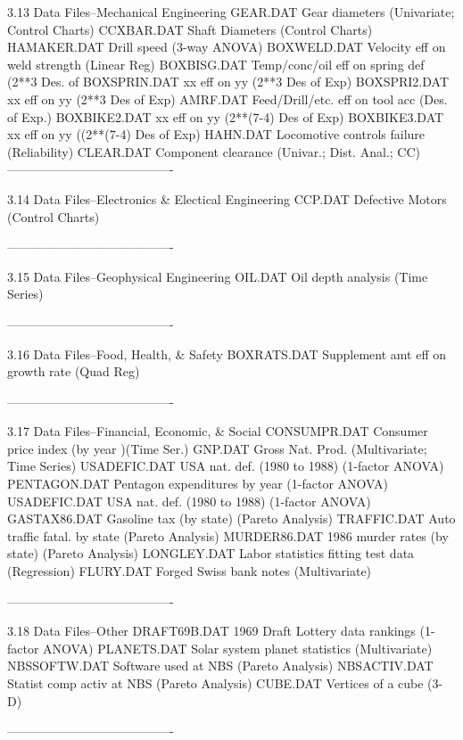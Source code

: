 3.13
Data Files--Mechanical Engineering
      GEAR.DAT      Gear diameters (Univariate; Control Charts)
      CCXBAR.DAT    Shaft Diameters (Control Charts)
      HAMAKER.DAT   Drill speed (3-way ANOVA)
      BOXWELD.DAT   Velocity eff on weld strength (Linear Reg)
      BOXBISG.DAT   Temp/conc/oil eff on spring def (2**3 Des. of
      BOXSPRIN.DAT  xx eff on yy (2**3 Des of Exp)
      BOXSPRI2.DAT  xx eff on yy (2**3 Des of Exp)
      AMRF.DAT      Feed/Drill/etc. eff on tool acc (Des. of Exp.)
      BOXBIKE2.DAT  xx eff on yy (2**(7-4) Des of Exp)
      BOXBIKE3.DAT  xx eff on yy ((2**(7-4) Des of Exp)
      HAHN.DAT      Locomotive controls failure (Reliability)
      CLEAR.DAT     Component clearance (Univar.; Dist. Anal.; CC)
----------------------------------------
 
3.14
Data Files--Electronics & Electical Engineering
      CCP.DAT       Defective Motors (Control Charts)
 
----------------------------------------
 
3.15
Data Files--Geophysical Engineering
      OIL.DAT       Oil depth analysis (Time Series)
 
 
----------------------------------------
 
3.16
Data Files--Food, Health, & Safety
      BOXRATS.DAT   Supplement amt eff on growth rate (Quad Reg)
 
----------------------------------------
 
3.17
Data Files--Financial, Economic, & Social
      CONSUMPR.DAT  Consumer price index (by year )(Time Ser.)
      GNP.DAT       Gross Nat. Prod. (Multivariate; Time Series)
      USADEFIC.DAT  USA nat. def. (1980 to 1988) (1-factor ANOVA)
      PENTAGON.DAT  Pentagon expenditures by year (1-factor ANOVA)
      USADEFIC.DAT  USA nat. def. (1980 to 1988) (1-factor ANOVA)
      GASTAX86.DAT  Gasoline tax (by state) (Pareto Analysis)
      TRAFFIC.DAT   Auto traffic fatal. by state (Pareto Analysis)
      MURDER86.DAT  1986 murder rates (by state) (Pareto Analysis)
      LONGLEY.DAT   Labor statistics fitting test data (Regression)
      FLURY.DAT     Forged Swiss bank notes (Multivariate)
 
----------------------------------------
 
3.18
Data Files--Other
      DRAFT69B.DAT  1969 Draft Lottery data rankings (1-factor ANOVA)
      PLANETS.DAT   Solar system planet statistics (Multivariate)
      NBSSOFTW.DAT  Software used at NBS (Pareto Analysis)
      NBSACTIV.DAT  Statist comp activ at NBS (Pareto Analysis)
      CUBE.DAT      Vertices of a cube (3-D)
 
----------------------------------------
